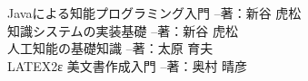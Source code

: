 \documentclass[uplatex,12pt]{jsarticle}
\begin{document}
\begin{thebibliography}{99}
 Javaによる知能プログラミング入門 --著：新谷 虎松 \\
 知識システムの実装基礎 --著：新谷 虎松 \\
 人工知能の基礎知識 --著：太原 育夫 \\
 LATEX2ε 美文書作成入門 --著：奥村 晴彦 \\
\end{thebibliography}
\end{document}
